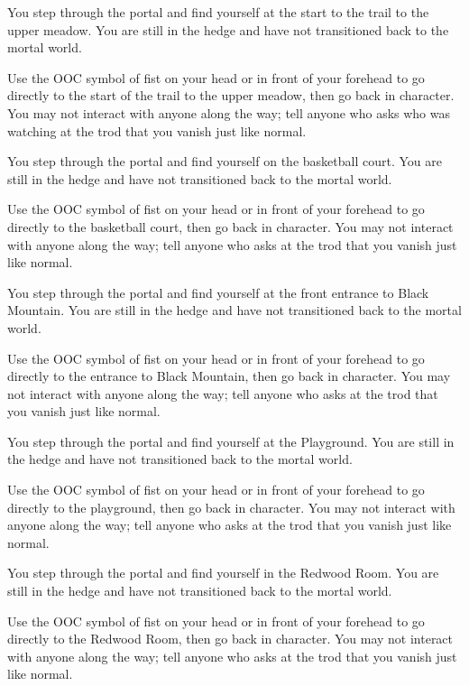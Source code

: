 \documentclass[green]{gl2018}
\begin{document}
\begin{sect}{2}
You step through the portal and find yourself at the start to the trail to the upper meadow. You are still in the hedge and have not transitioned back to the mortal world.

Use the OOC symbol of fist on your head or in front of your forehead to go directly to the start of the trail to the upper meadow, then go back in character. You may not interact with anyone along the way; tell anyone who asks who was watching at the trod that you vanish just like normal.
\end{sect}
\begin{sect}{3}
You step through the portal and find yourself on the basketball court. You are still in the hedge and have not transitioned back to the mortal world.

Use the OOC symbol of fist on your head or in front of your forehead to go directly to the basketball court, then go back in character. You may not interact with anyone along the way; tell anyone who asks at the trod that you vanish just like normal.

\end{sect}
\begin{sect}{4}
You step through the portal and find yourself at the front entrance to Black Mountain. You are still in the hedge and have not transitioned back to the mortal world.

Use the OOC symbol of fist on your head or in front of your forehead to go directly to the entrance to Black Mountain, then go back in character. You may not interact with anyone along the way; tell anyone who asks at the trod that you vanish just like normal.

\end{sect}
\begin{sect}{5}
You step through the portal and find yourself at the Playground. You are still in the hedge and have not transitioned back to the mortal world.

Use the OOC symbol of fist on your head or in front of your forehead to go directly to the playground, then go back in character. You may not interact with anyone along the way; tell anyone who asks at the trod that you vanish just like normal.

\end{sect}
\begin{sect}{6}
You step through the portal and find yourself in the Redwood Room. You are still in the hedge and have not transitioned back to the mortal world.

Use the OOC symbol of fist on your head or in front of your forehead to go directly to the Redwood Room, then go back in character. You may not interact with anyone along the way; tell anyone who asks at the trod that you vanish just like normal.
\end{sect}
\end{document}
